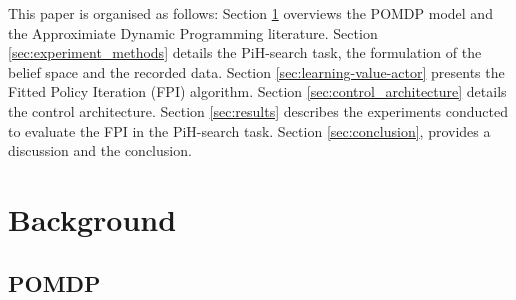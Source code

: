 \documentclass[final,5p,times,twocolumn]{elsarticle}
\begin{document}


This paper is organised as follows: Section \ref{sec:related_work} overviews the POMDP model and the Approximiate Dynamic Programming 
literature. Section \ref{sec:experiment_methods} details the PiH-search task, the formulation of the belief space and the recorded data. Section \ref{sec:learning-value-actor} presents the Fitted Policy Iteration (FPI) algorithm.
Section \ref{sec:control_architecture} details the control architecture. Section \ref{sec:results} describes the experiments 
conducted to evaluate the FPI in the PiH-search task. Section \ref{sec:conclusion}, provides a discussion and the conclusion.


\section{Background}\label{sec:related_work}

\subsection{POMDP}
\end{document}
